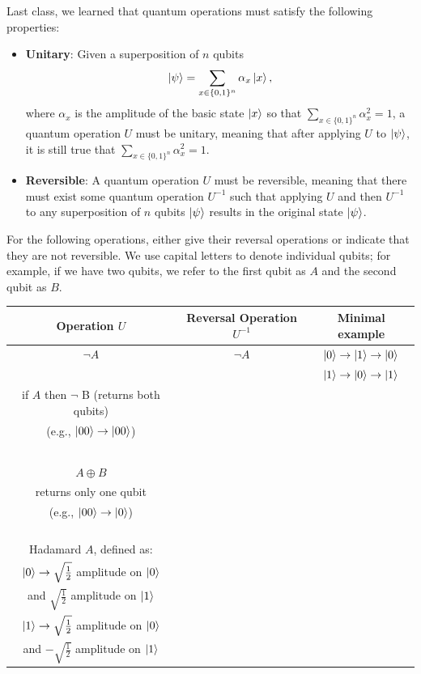 \documentclass[11pt]{article}
\begin{document}
Last class, we learned that quantum operations must satisfy
the following properties:
\begin{itemize}
    \item \textbf{Unitary}: Given a superposition of $n$ qubits 
    \[\ket{\psi} = \sum_{x \in \{0,1\}^n} \alpha_x \ket{x},\]
    where $\alpha_x$ is the amplitude of the basic state $\ket{x}$
    so that $\sum_{x \in \{0,1\}^n} \alpha_x^2 = 1$, a quantum operation $U$ must be unitary,
    meaning that after applying $U$ to $\ket{\psi}$, it is still true that $\sum_{x \in \{0,1\}^n} \alpha_x^2 = 1$.
    \item \textbf{Reversible}: A quantum operation $U$ must be reversible,
    meaning that there must exist some quantum operation $U^{-1}$ such that
    applying $U$ and then $U^{-1}$ to any superposition of $n$ qubits
    $\ket{\psi}$ results in the original state $\ket{\psi}$.
\end{itemize}

For the following operations, either give their reversal operations or indicate that
they are not reversible. We use capital letters to denote individual qubits; for example,
if we have two qubits, we refer to the first qubit as $A$ and the second qubit as $B$.

\begin{table}[h]
\begin{tabular}{c|c|c}
    Operation $U$ & Reversal Operation $U^{-1}$ & Minimal example\\
    \hline
    $\neg A$ & $\neg A$ & $\ket{0} \to \ket{1} \to \ket{0}$ \\
     &  & $\ket{1} \to \ket{0} \to \ket{1}$ \\
     \hline
    if $A$ then $\neg$ B (returns both qubits) &   \\
    (e.g., $\ket{00} \to \ket{00}$) & & \\
    & & \\
    & & \\
    & & \\
    & & \\
    & & \\
    \hline
    $A \oplus B$ &   \\
    returns only one qubit& & \\
    (e.g., $\ket{00} \to \ket{0}$) & & \\
    & & \\
    & & \\
    & & \\
    & & \\
    \hline
    Hadamard $A$, defined as: & & \\
    $\ket{0} \to \sqrt{\frac{1}{2}}$ amplitude on $\ket{0}$ & & \\
    and $\sqrt{\frac{1}{2}}$ amplitude on $\ket{1}$ & & \\
    $\ket{1} \to \sqrt{\frac{1}{2}}$ amplitude on $\ket{0}$ & & \\
    and $-\sqrt{\frac{1}{2}}$ amplitude on $\ket{1}$ & & \\
\end{tabular}
\end{table}
\end{document}
